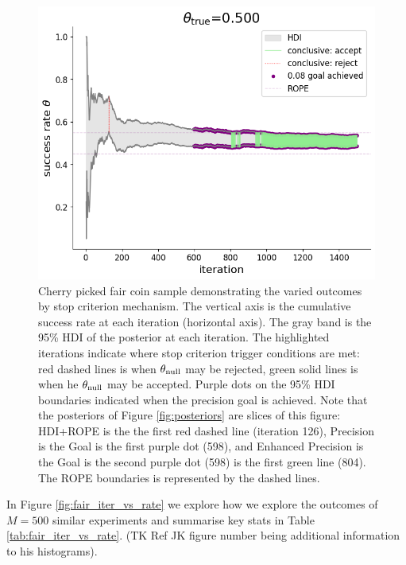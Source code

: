 \documentclass{article}
\begin{document}
\begin{figure}[h!]
  \centering
  \includegraphics[width=1\textwidth]{cherry_iterations.png}
  \caption{Cherry picked fair coin sample demonstrating the varied outcomes by
  stop criterion mechanism. The vertical axis is the cumulative success rate
  at each iteration (horizontal axis).
  The gray band is the 95\% HDI of the posterior at each iteration.
  The highlighted iterations indicate where stop criterion trigger conditions are met:
  red dashed lines is when  $\theta_{\rm null}$ may be rejected, green solid lines
  is when he $\theta_{\rm null}$ may be accepted. Purple dots on the 95\% HDI boundaries
  indicated when the precision goal is achieved. Note that the posteriors of Figure \ref{fig:posteriors}
  are slices of this figure: HDI+ROPE is the the first red dashed line (iteration 126),
  Precision is the Goal is the first purple dot (598), and Enhanced Precision is the Goal is the second purple dot (598)
  is the first green line (804). The ROPE boundaries is represented by the dashed lines.
  }
  \label{fig:iterations}
\end{figure}

In Figure \ref{fig:fair_iter_vs_rate} we explore how we explore the outcomes of $M=500$
similar experiments and summarise key stats in Table \ref{tab:fair_iter_vs_rate}. (TK Ref JK figure number being additional information to his histograms).
\end{document}

